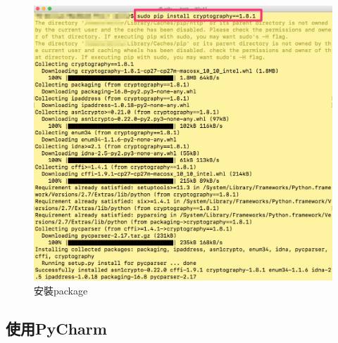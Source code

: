 \documentclass[12pt,a4paper]{article}
\begin{document}
{\begin{figure}[ht]
	\begin{center}
		\includegraphics[scale=0.3]{image/termanal2.png}
		\caption{安裝package}
	\end{center}
\end{figure}
}

\subsection{使用PyCharm}
\end{document}

